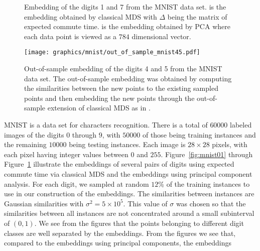 \begin{figure}[htbp]
  \begin{center}
  \caption{Embedding of the digits 1 and 7 from the MNIST data
    set.  is the embedding obtained by
    classical MDS with $\Delta$ being the matrix of expected commute
    time.  is the embedding obtained by
    PCA where each data point is viewed as a $784$ dimensional vector.
    }
  \label{fig:mnist17}
  \end{center}
\end{figure}    
\begin{figure}[htbp]
  \begin{center}
    \texttt{[image: graphics/mnist/out\_of\_sample\_mnist45.pdf]}
    \caption{Out-of-sample embedding of the digits 4 and 5 from the MNIST data
    set. The out-of-sample embedding was obtained by computing the
    similarities between the new points to the existing sampled points
    and then embedding the new points through the out-of-sample extension of
    classical MDS as in \cite{bengio04:_out_lle_isomap_mds_eigen}.}  
  \label{fig:out_of_sample_mnist45}
  \end{center}
\end{figure} 
MNIST \citep{lecun98:_gradien} is a data set for
characters recognition. There is a total of $60000$ labeled images of
the digits $0$ through $9$, with $50000$ of those being training
instances and the remaining $10000$ being testing instances. Each
image is $28 \times 28$ pixels, with each pixel having integer values
between $0$ and $255$. Figure~\ref{fig:mnist01} through
Figure~\ref{fig:mnist17} illustrate the embeddings of several pairs of
digits using expected commute time via classical MDS and the
embeddings using principal component analysis. For each digit, we
sampled at random $12$\% of the training instances to use in our
construction of the embeddings. The similarities between instances are
Gaussian similarities with $\sigma^2 = 5 \times 10^5$. This value of
$\sigma$ was chosen so that the similarities between all instances are
not concentrated around a small subinterval of $(0,1)$. We see from
the figures that the points belonging to different digit classes are
well separated by the embeddings. From the figures we see that,
compared to the embeddings using principal components, the embeddings
